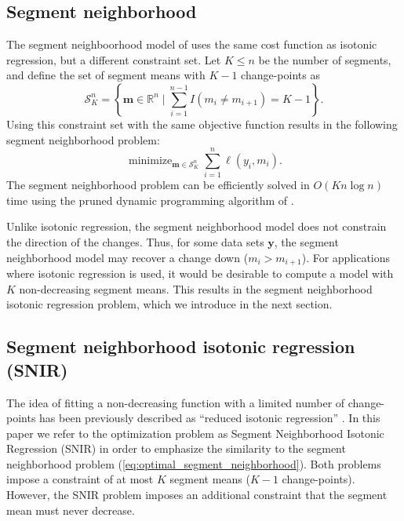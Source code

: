 \documentclass{article}
\DeclareMathOperator*{\minimize}{minimize}
\newcommand{\RR}{\mathbb R}
\begin{document}
\subsection{Segment neighborhood}

The segment neighboorhood model of \citet{segment-neighborhood} uses
the same cost function as isotonic regression, but a different
constraint set. Let $K\leq n$ be the number of segments, and define
the set of segment means with $K-1$ change-points as
\begin{equation}
  \label{eq:Sk}
  \mathcal S_K^n = \left\{
  \mathbf m\in\RR^n
  \mid
  \sum_{i=1}^{n-1} I(m_i \neq m_{i+1}) = K-1
  \right\}.
\end{equation}
Using this constraint set with the same objective function results in
the following segment neighborhood problem:
\begin{equation}
  \label{eq:optimal_segment_neighborhood}
  \minimize_{\mathbf m\in\mathcal S_K^n} \sum_{i=1}^n \ell(y_i, m_i).
\end{equation}
The segment neighborhood problem can be efficiently solved in
$O(K n \log n)$ time using the pruned dynamic programming algorithm of
\citet{pruned-dp}.

Unlike isotonic regression, the segment neighborhood model
does not constrain the direction of the changes. Thus, for some
data sets $\mathbf y$, the segment neighborhood model may
recover a change down ($m_i > m_{i+1}$). For applications where
isotonic regression is used, it would be desirable to compute a model
with $K$ non-decreasing segment means. This results in the segment neighborhood
isotonic regression problem, which we introduce in the next section.

\subsection{Segment neighborhood isotonic regression (SNIR)}

The idea of fitting a non-decreasing function with a limited number of
change-points has been previously described as ``reduced isotonic
regression'' \citep{reduced-monotonic-regression,
  hardwick2014optimal}. In this paper we refer to the optimization
problem as Segment Neighborhood Isotonic Regression (SNIR) in order to
emphasize the similarity to the segment neighborhood problem
(\ref{eq:optimal_segment_neighborhood}). Both problems impose a
constraint of at most $K$ segment means ($K-1$
change-points). However, the SNIR problem imposes an additional
constraint that the segment mean must never decrease.
\end{document}
